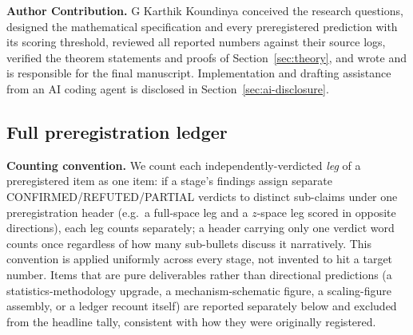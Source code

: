 \documentclass[pdflatex,sn-mathphys-ay]{sn-jnl}
\theoremstyle{thmstyleone}
\theoremstyle{thmstyletwo}
\begin{document}
\textbf{Author Contribution.} G Karthik Koundinya conceived the research questions, designed the mathematical specification and every preregistered prediction with its scoring threshold, reviewed all reported numbers against their source logs, verified the theorem statements and proofs of Section~\ref{sec:theory}, and wrote and is responsible for the final manuscript. Implementation and drafting assistance from an AI coding agent is disclosed in Section~\ref{sec:ai-disclosure}.



\begin{appendices}

\section{Full preregistration ledger}
\label{app:ledger}

\textbf{Counting convention.} We count each independently-verdicted \emph{leg} of a preregistered item as one item: if a stage's findings assign separate CONFIRMED/REFUTED/PARTIAL verdicts to distinct sub-claims under one preregistration header (e.g.\ a full-space leg and a $z$-space leg scored in opposite directions), each leg counts separately; a header carrying only one verdict word counts once regardless of how many sub-bullets discuss it narratively. This convention is applied uniformly across every stage, not invented to hit a target number. Items that are pure deliverables rather than directional predictions (a statistics-methodology upgrade, a mechanism-schematic figure, a scaling-figure assembly, or a ledger recount itself) are reported separately below and excluded from the headline tally, consistent with how they were originally registered.


\end{appendices}
\end{document}
